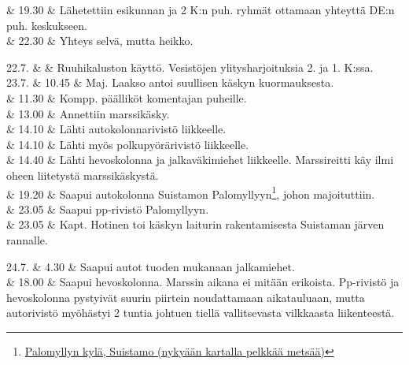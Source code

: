 \documentclass[11pt,a5paper,oneside]{book}
\begin{document}
& 19.30 & Lähetettiin esikunnan ja 2 K:n puh. ryhmät ottamaan yhteyttä DE:n puh. keskukseen. \newline \\

& 22.30 & Yhteys selvä, mutta heikko. \\
\newpage

22.7. & & Ruuhikaluston käyttö. Vesistöjen ylitysharjoituksia 2. ja 1. K:ssa. \newline\newline\newline \\

23.7. & 10.45 & Maj. Laakso antoi suullisen käskyn kuormauksesta. \\

& 11.30 & Kompp. päälliköt komentajan puheille. \\

& 13.00 & Annettiin marssikäsky. \\

& 14.10 & Lähti autokolonnarivistö liikkeelle. \\

& 14.10 & Lähti myös polkupyörärivistö liikkeelle. \\

& 14.40 & Lähti hevoskolonna ja jalkaväkimiehet liikkeelle. Marssireitti käy ilmi oheen liitetystä marssikäskystä. \\

& 19.20 & Saapui autokolonna Suistamon Palomyllyyn\footnote{\href{https://www.google.fi/maps/place/61\%C2\%B053'58.2\%22N+31\%C2\%B011'40.9\%22E/}{Palomyllyn kylä, Suistamo (nykyään kartalla pelkkää metsää)}}, johon majoituttiin. \newline \\

& 23.05 & Saapui pp-rivistö Palomyllyyn. \newline \\

& 23.05 & Kapt. Hotinen toi käskyn laiturin rakentamisesta Suistaman järven rannalle. \\

\taulustop


24.7. & 4.30 & Saapui autot tuoden mukanaan jalkamiehet. \newline \\

& 18.00 & Saapui hevoskolonna. \newline Marssin aikana ei mitään erikoista. Pp-rivistö ja hevoskolonna pystyivät suurin piirtein noudattamaan aikatauluaan, mutta autorivistö myöhästyi 2 tuntia johtuen tiellä vallitsevasta vilkkaasta liikenteestä. \newline\newline \\
\end{document}
